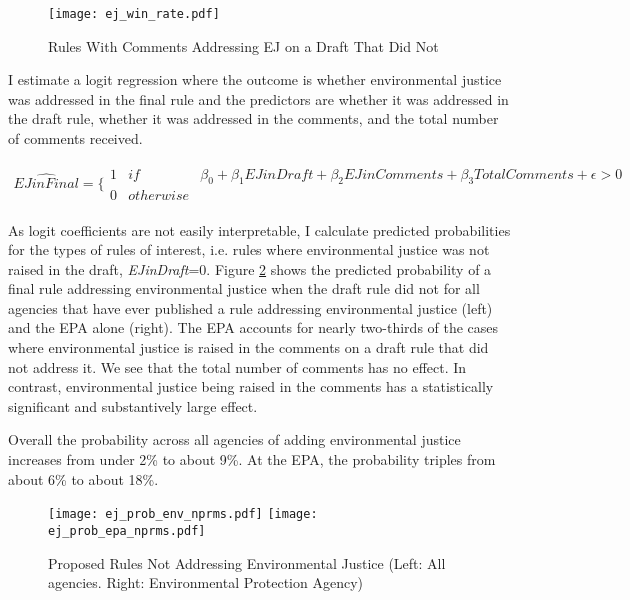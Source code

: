 \begin{figure}[h!]
\caption{Rules With Comments Addressing EJ on a Draft That Did Not}
\centering
\texttt{[image: ej\_win\_rate.pdf]}
\label{ejwinrate}
\end{figure}




I estimate a logit regression where the outcome is whether environmental justice was addressed in the final rule and the predictors are whether it was addressed in the draft rule, whether it was addressed in the comments, and the total number of comments received. 

\begin{align*}
  \hat{EJ in Final} = \Bigg\{ \begin{array}{lll}
    1 & if &  \beta_0 + \beta_1 EJ in Draft + \beta_2 EJ in Comments + \beta_3 Total Comments  + \epsilon > 0\\
0 & otherwise &  
  \end{array}
\end{align*}

As logit coefficients are not easily interpretable, I calculate predicted probabilities for the types of rules of interest, i.e. rules where environmental justice was not raised in the draft, \textit{EJinDraft}=0.  Figure \ref{ejpredicted} shows the predicted probability of a final rule addressing environmental justice when the draft rule did not for all agencies that have ever published a rule addressing environmental justice (left) and the EPA alone (right). The EPA accounts for nearly two-thirds of the cases where environmental justice is raised in the comments on a draft rule that did not address it. We see that the total number of comments has no effect. In contrast, environmental justice being raised in the comments has a statistically significant and substantively large effect. 

Overall the probability across all agencies of adding environmental justice increases from under 2\% to about 9\%. At the EPA, the probability triples from about 6\% to about 18\%. 


\begin{figure}[h!]
\caption{Proposed Rules Not Addressing Environmental Justice (Left: All agencies. Right: Environmental Protection Agency)}
\centering
\noindent
\texttt{[image: ej\_prob\_env\_nprms.pdf]}
\texttt{[image: ej\_prob\_epa\_nprms.pdf]}
\label{ejpredicted}
\end{figure}

